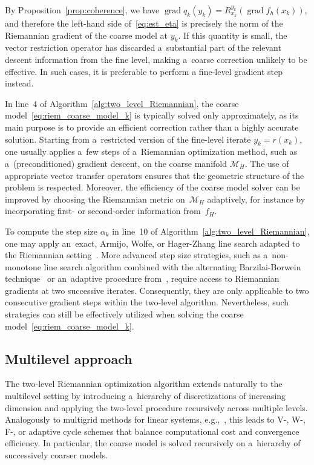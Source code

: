 \documentclass[11pt,reqno]{amsart}
\theoremstyle{plain}
\DeclareMathOperator{\grad}{grad}
\newcommand{\M}{\mathcal{M}}
\begin{document}
	By Proposition~\ref{prop:coherence}, we have $\grad q_k(y_k) = R^{y_k}_{x_k}(\grad f_h(x_k))$, and therefore the left-hand side of~\eqref{eq:est_eta} is precisely the norm of the Riemannian gradient of the coarse model at $y_k$. If this quantity is small, the vector restriction operator has discarded a~substantial part of the relevant descent information from the fine level, making a~coarse correction unlikely to be effective. In such cases, it is preferable to perform a fine-level gradient step instead.
	
	In line~4 of Algorithm~\ref{alg:two_level_Riemannian}, the coarse model~\eqref{eq:riem_coarse_model_k} is typically solved only approximately, as its main purpose is to provide an efficient correction rather than a highly accurate solution. Starting from a~restricted version of the fine-level iterate $y_k=r(x_k)$, one usually applies a~few steps of a~Riemannian optimization method, such as a~(preconditioned) gradient descent, on the coarse manifold $\M_H$. The use of appropriate vector transfer operators ensures that the geometric structure of the problem is respected. Moreover, the efficiency of the coarse model solver can be improved by choosing the Riemannian metric on~$\M_H$ adaptively, for instance by incorporating first- or second-order information from~$f_H$.
	
	To compute the step size $\alpha_k$ in line~10 of Algorithm~\ref{alg:two_level_Riemannian}, one may apply an~exact, Armijo, Wolfe, or Hager-Zhang line search adapted to the Riemannian setting~\cite{AbsMS08,SutV2021,ZhaH04}. More advanced step size strategies, such as a~non-monotone line search algorithm combined with the alternating Barzilai-Borwein technique~\cite{WenY13,ZhaH04} or an~adaptive procedure from~\cite{AnsM25}, require access to Riemannian gradients at two successive iterates. Consequently, they are only applicable to two consecutive gradient steps within the two-level algorithm. Nevertheless, such strategies can still be effectively utilized when solving the coarse model~\eqref{eq:riem_coarse_model_k}.
	
	\subsection{Multilevel approach}
	\label{ssec:miltilevel}
	
	The two-level Riemannian optimization algorithm extends naturally to the multilevel setting by introducing a~hierarchy of discretizations of increasing dimension and applying the two-level procedure recursively across multiple levels. Analogously to multigrid methods for linear systems, e.g.,~\cite{BriHM00}, this leads to \mbox{V-}, W-, F-, or adaptive cycle schemes that balance computational cost and convergence efficiency. In particular, the coarse model is solved recursively on a~hierarchy of successively coarser models. 
	
\end{document}
